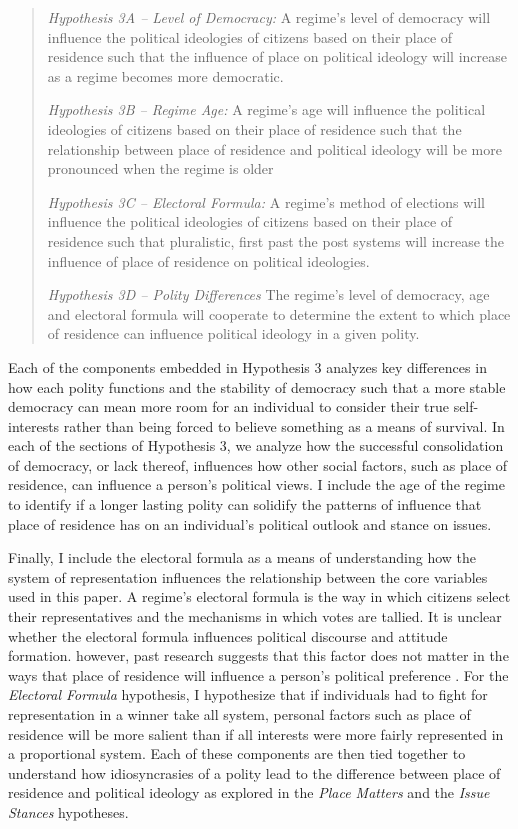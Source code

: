 \documentclass[12pt, titlepage]{article}
\newcommand\e{\emph}
\begin{document}
\begin{quote}
	\e{Hypothesis 3A -- Level of Democracy:} A regime's level of democracy will influence the political ideologies of citizens based on their place of residence such that the influence of place on political ideology will increase as a regime becomes more democratic. 
	
	\e{Hypothesis 3B -- Regime Age:} A regime's age will influence the political ideologies of citizens based on their place of residence such that the relationship between place of residence and political ideology will be more pronounced when the regime is older
	
	\e{Hypothesis 3C -- Electoral Formula:} A regime's method of elections will influence the political ideologies of citizens based on their place of residence such that pluralistic, first past the post systems will increase the influence of place of residence on political ideologies.
	
	\e{Hypothesis 3D -- Polity Differences} The regime's level of democracy, age and electoral formula will cooperate to determine the extent to which place of residence can influence political ideology in a given polity.
\end{quote}

Each of the components embedded in Hypothesis 3 analyzes key differences in how each polity functions and the stability of democracy such that a more stable democracy can mean more room for an individual to consider their true self-interests rather than being forced to believe something as a means of survival. In each of the sections of Hypothesis 3, we analyze how the successful consolidation of democracy, or lack thereof, influences how other social factors, such as place of residence, can influence a person's political views. I include the age of the regime to identify if a longer lasting polity can solidify the patterns of influence that place of residence has on an individual's political outlook and stance on issues. 

Finally, I include the electoral formula as a means of understanding how the system of representation influences the relationship between the core variables used in this paper. A regime's electoral formula is the way in which citizens select their representatives and the mechanisms in which votes are tallied. It is unclear whether the electoral formula influences political discourse and attitude formation. however, past research suggests that this factor does not matter in the ways that place of residence will influence a person's political preference \cite{barkan_space_2006}. For the \e{Electoral Formula} hypothesis, I hypothesize that if individuals had to fight for representation in a winner take all system, personal factors such as place of residence will be more salient than if all interests were more fairly represented in a proportional system. Each of these components are then tied together to understand how idiosyncrasies of a polity lead to the difference between place of residence and political ideology as explored in the \e{Place Matters} and the \e{Issue Stances} hypotheses.
\end{document}
